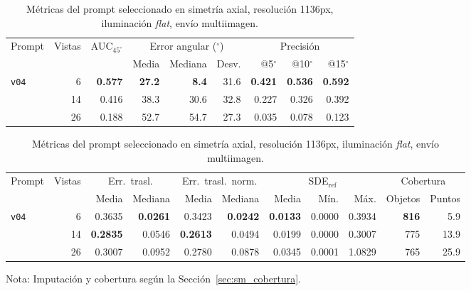 \newpage

\clearpage
\begin{table}[H]
\centering
\caption{Métricas del prompt seleccionado en simetría axial, resolución 1136px, iluminación \textit{flat}, envío multiimagen.}
\label{tab:nov_axis_1136}
\footnotesize
\setlength{\tabcolsep}{3pt}
\renewcommand{\arraystretch}{0.95}

\begin{tabular*}{\textwidth}{@{\extracolsep{\fill}}lrrrrrrrr@{}}
\toprule
\multirow{2}{*}{Prompt} & \multirow{2}{*}{Vistas} & \multirow{2}{*}{AUC$_{45^\circ}$} & \multicolumn{3}{c}{Error angular ($^\circ$)} & \multicolumn{3}{c}{Precisión} \\
\cmidrule(lr){4-6} \cmidrule(lr){7-9}
 &  &  & Media & Mediana & Desv. & @5$^\circ$ & @10$^\circ$ & @15$^\circ$ \\
\midrule
\multirow{3}{*}{\texttt{v04}} & 6 & \textbf{0.577} & \textbf{27.2} & \textbf{8.4} & 31.6 & \textbf{0.421} & \textbf{0.536} & \textbf{0.592} \\
 & 14 & 0.416 & 38.3 & 30.6 & 32.8 & 0.227 & 0.326 & 0.392 \\
 & 26 & 0.188 & 52.7 & 54.7 & 27.3 & 0.035 & 0.078 & 0.123 \\
\bottomrule
\end{tabular*}

\vspace{2ex}

\begin{tabular*}{\textwidth}{@{\extracolsep{\fill}}lrrrrrrrrrr@{}}
\toprule
\multirow{2}{*}{Prompt} & \multirow{2}{*}{Vistas} & \multicolumn{2}{c}{Err.\ trasl.} & \multicolumn{2}{c}{Err.\ trasl.\ norm.} & \multicolumn{3}{c}{SDE$_{\mathrm{ref}}$} & \multicolumn{2}{c}{Cobertura} \\
\cmidrule(lr){3-4} \cmidrule(lr){5-6} \cmidrule(lr){7-9} \cmidrule(lr){10-11}
 &  & Media & Mediana & Media & Mediana & Media & Mín. & Máx. & Objetos & Puntos \\
\midrule
\multirow{3}{*}{\texttt{v04}} & 6 & 0.3635 & \textbf{0.0261} & 0.3423 & \textbf{0.0242} & \textbf{0.0133} & 0.0000 & 0.3934 & \textbf{816} & 5.9 \\
 & 14 & \textbf{0.2835} & 0.0546 & \textbf{0.2613} & 0.0494 & 0.0199 & 0.0000 & 0.3007 & 775 & 13.9 \\
 & 26 & 0.3007 & 0.0952 & 0.2780 & 0.0878 & 0.0345 & 0.0001 & 1.0829 & 765 & 25.9 \\
\bottomrule
\end{tabular*}

\vspace{1.5ex}
\begin{minipage}{\textwidth}
Nota: Imputación y cobertura según la Sección~\ref{sec:sm_cobertura}.
\end{minipage}
\end{table}



